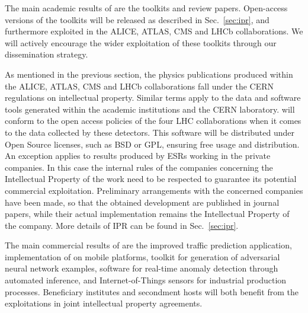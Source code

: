 The main academic results of \acronym are the toolkits and review
papers. Open-access versions of the toolkits will be released 
as described in Sec.~\ref{sec:ipr}, 
and furthermore exploited in the ALICE, ATLAS, CMS and LHCb collaborations.%
We will actively encourage the wider exploitation of these toolkits
through our dissemination strategy.%

As mentioned in the previous section, the physics publications produced within
the ALICE, ATLAS, CMS and LHCb collaborations fall under the CERN regulations on intellectual
property. Similar terms apply to the data and software tools generated within
the academic institutions and the CERN laboratory. \acronym will
conform to the open access policies of the four LHC collaborations
when it comes to the data collected by these detectors. 
This software will be distributed under Open Source licenses, such
as BSD or GPL, ensuring free usage and distribution. An exception
applies to results produced by ESRs working in the private
companies. In this case the internal rules of the  companies
concerning the Intellectual Property of the work need to be respected
to guarantee its potential commercial  exploitation.
Preliminary arrangements with the concerned companies have been made,
so that the obtained development are published in journal papers,
while their actual implementation remains the Intellectual Property of
the company. More details of IPR can be found in Sec.~\ref{sec:ipr}.

The main commercial results of \acronym are the 
improved \ximantis traffic prediction application,
implementation of \tensorflow on mobile platforms,
toolkit for generation of adversarial neural network examples,
software for real-time anomaly detection through automated inference, and
Internet-of-Things sensors for industrial production processes. 
Beneficiary institutes and secondment hosts will both benefit from
the exploitations in joint intellectual property agreements. 

